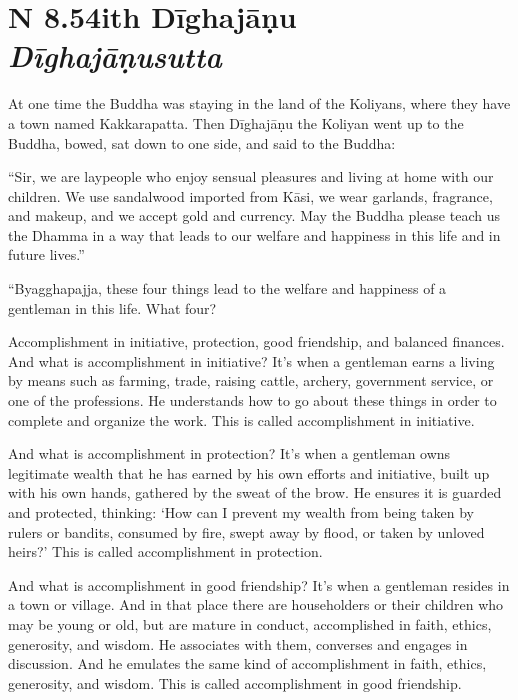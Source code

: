 \documentclass[12pt,openany]{book}%
\newcommand*{\suttatitleacronym}[1]{\smaller[2]{#1}\vspace*{.3em}}
\newcommand*{\suttatitletranslation}[1]{\linebreak{#1}}
\newcommand*{\suttatitleroot}[1]{\linebreak\smaller[2]\itshape{#1}}
\newcommand*{\tocacronym}[1]{\hspace*{-3.3em}{#1}\quad}
\newcommand*{\toctranslation}[1]{#1}
\newcommand*{\tocroot}[1]{(\textit{#1})}
\begin{document}
%
\section*{{\suttatitleacronym AN 8.54}{\suttatitletranslation With Dīghajāṇu }{\suttatitleroot Dīghajāṇusutta}}
\addcontentsline{toc}{section}{\tocacronym{AN 8.54} \toctranslation{With Dīghajāṇu } \tocroot{Dīghajāṇusutta}}

At one time the Buddha was staying in the land of the Koliyans, where they have a town named Kakkarapatta. Then \textsanskrit{Dīghajāṇu} the Koliyan went up to the Buddha, bowed, sat down to one side, and said to the Buddha: 

“Sir, we are laypeople who enjoy sensual pleasures and living at home with our children. We use sandalwood imported from \textsanskrit{Kāsi}, we wear garlands, fragrance, and makeup, and we accept gold and currency. May the Buddha please teach us the Dhamma in a way that leads to our welfare and happiness in this life and in future lives.” 

“Byagghapajja, these four things lead to the welfare and happiness of a gentleman in this life. What four? 

Accomplishment in initiative, protection, good friendship, and balanced finances. And what is accomplishment in initiative? It’s when a gentleman earns a living by means such as farming, trade, raising cattle, archery, government service, or one of the professions. He understands how to go about these things in order to complete and organize the work. This is called accomplishment in initiative. 

And what is accomplishment in protection? It’s when a gentleman owns legitimate wealth that he has earned by his own efforts and initiative, built up with his own hands, gathered by the sweat of the brow. He ensures it is guarded and protected, thinking: ‘How can I prevent my wealth from being taken by rulers or bandits, consumed by fire, swept away by flood, or taken by unloved heirs?’ This is called accomplishment in protection. 

And what is accomplishment in good friendship? It’s when a gentleman resides in a town or village. And in that place there are householders or their children who may be young or old, but are mature in conduct, accomplished in faith, ethics, generosity, and wisdom. He associates with them, converses and engages in discussion. And he emulates the same kind of accomplishment in faith, ethics, generosity, and wisdom. This is called accomplishment in good friendship. 
\end{document}
